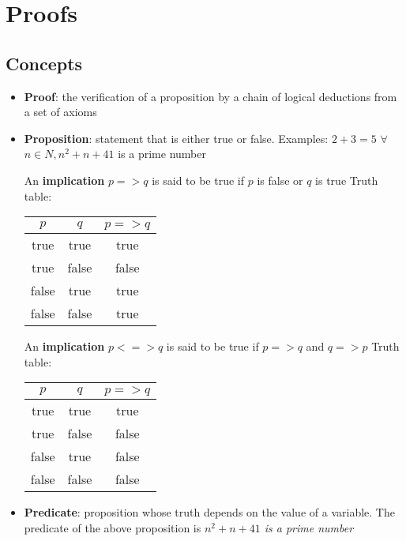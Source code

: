 \documentclass{article}
\begin{document}
	\section{Proofs}
	\subsection{Concepts}
	\begin{itemize}
		\item \textbf{Proof}: the verification of a proposition by a chain of logical deductions from a set of axioms
		
		\item \textbf{Proposition}: statement that is either true or false. Examples:\newline
		$2 + 3 = 5$\newline
		$\forall$ $n \in N, n^2 + n + 41$ is a prime number
		
		An \textbf{implication} $p => q$ is said to be true if $p$ is false or $q$ is true\newline
		Truth table:\newline
		\begin{tabular}{ |c|c|c| } 
			\hline
			$p$ & $q$ & $p => q$ \\
			\hline
			true & true & true \\
			true & false & false \\ 
			false & true & true \\ 
			false & false & true \\
			\hline
		\end{tabular}
		
		An \textbf{implication} $p <=> q$ is said to be true if $p => q$ and $q => p$\newline
		Truth table:\newline
		\begin{tabular}{ |c|c|c| } 
			\hline
			$p$ & $q$ & $p => q$ \\
			\hline
			true & true & true \\
			true & false & false \\ 
			false & true & false \\ 
			false & false & false \\
			\hline
		\end{tabular}
		
		\item \textbf{Predicate}: proposition whose truth depends on the value of a variable. The predicate of the above proposition is \textit{$n^2 + n + 41$ is a prime number}
		

\end{itemize}
\end{document}
